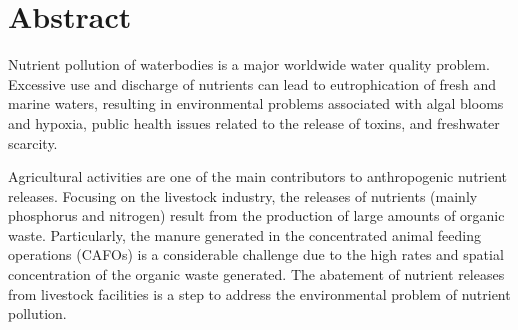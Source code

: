 
\chapter*{Abstract}


Nutrient pollution of waterbodies is a major worldwide water quality problem. Excessive use and discharge of nutrients can lead to eutrophication of fresh and marine waters, resulting in environmental problems associated with algal blooms and hypoxia, public health issues related to the release of toxins, and freshwater scarcity. 

Agricultural activities are one of the main contributors to anthropogenic nutrient releases. Focusing on the livestock industry, the releases of nutrients (mainly phosphorus and nitrogen) result from the production of large amounts of organic waste. 
Particularly, the manure generated in the concentrated animal feeding oper­ations (CAFOs) is a considerable challenge due to the high rates and spatial concentration of the organic waste generated.
The abatement of nutrient releases from livestock facilities is a step to address the environmental problem of nutrient pollution.

